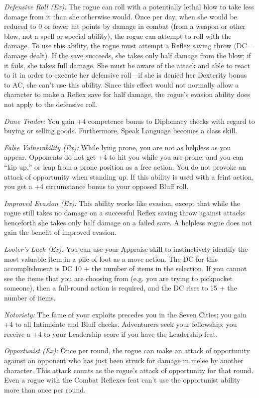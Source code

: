 \textit{Defensive Roll (Ex):} The rogue can roll with a potentially lethal blow to take less damage from it than she otherwise would. Once per day, when she would be reduced to 0 or fewer hit points by damage in combat (from a weapon or other blow, not a spell or special ability), the rogue can attempt to roll with the damage. To use this ability, the rogue must attempt a Reflex saving throw (DC = damage dealt). If the save succeeds, she takes only half damage from the blow; if it fails, she takes full damage. She must be aware of the attack and able to react to it in order to execute her defensive roll---if she is denied her Dexterity bonus to AC, she can't use this ability. Since this effect would not normally allow a character to make a Reflex save for half damage, the rogue's evasion ability does not apply to the defensive roll.

\textit{Dune Trader:} You gain +4 competence bonus to Diplomacy checks with regard to buying or selling goods. Furthermore, Speak Language becomes a class skill.

\textit{False Vulnerability (Ex):} While lying prone, you are not as helpless as you appear. Opponents do not get +4 to hit you while you are prone, and you can ``kip up,'' or leap from a prone position as a free action. You do not provoke an attack of opportunity when standing up. If this ability is used with a feint action, you get a +4 circumstance bonus to your opposed Bluff roll.

\textit{Improved Evasion (Ex):} This ability works like evasion, except that while the rogue still takes no damage on a successful Reflex saving throw against attacks henceforth she takes only half damage on a failed save. A helpless rogue does not gain the benefit of improved evasion.

\textit{Looter's Luck (Ex):} You can use your Appraise skill to instinctively identify the most valuable item in a pile of loot as a move action. The DC for this accomplishment is DC 10 + the number of items in the selection. If you cannot see the items that you are choosing from (e.g. you are trying to pickpocket someone), then a full-round action is required, and the DC rises to 15 + the number of items.

\textit{Notoriety:} The fame of your exploits precedes you in the Seven Cities; you gain +4 to all Intimidate and Bluff checks. Adventurers seek your fellowship; you receive a +4 to your Leadership score if you have the Leadership feat.

\textit{Opportunist (Ex):} Once per round, the rogue can make an attack of opportunity against an opponent who has just been struck for damage in melee by another character. This attack counts as the rogue's attack of opportunity for that round. Even a rogue with the Combat Reflexes feat can't use the opportunist ability more than once per round.

